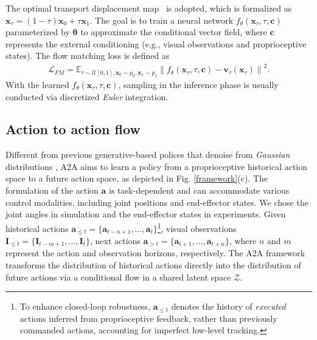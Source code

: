 \documentclass[onecolumn]{fairmeta}
\newcommand{\m}[1]{{A2A}}
\begin{document}
	The optimal transport displacement map~\citep{flowmatching} is adopted, which is formalized as $\mathbf{x}_\tau = (1 - \tau)\mathbf{x}_0 + \tau \mathbf{x}_1$. The goal is to train a neural network $f_\theta(\mathbf{x}_\tau, \tau, \mathbf{c})$ parameterized by $\mathbf{\theta}$ to approximate the conditional vector field, where $\mathbf{c}$ represents the external conditioning (e.g., visual observations and proprioceptive states). The flow matching loss is defined as 
	\begin{equation}
		\begin{aligned}
			\mathcal{L}_{FM} = \mathbb{E}_{\tau \sim \mathcal{U}[0,1], \mathbf{x}_0\sim p_0, \mathbf{x}_1\sim p_1} \left\| f_\theta(\mathbf{x}_\tau, \tau, \mathbf{c}) - \mathbf{v}_\tau(\mathbf{x}_\tau) \right\|^2.
			\label{general_loss}
		\end{aligned}
	\end{equation}
	With the learned $f_\theta(\mathbf{x}_\tau, \tau, \mathbf{c})$, sampling in the inference phase is usually conducted via discretized \textit{Euler} integration.
	
	
	
	\subsection{Action to action flow}
	Different from previous generative-based polices that denoise from \textit{Gaussian} distributions \citep{ddpm, flowmatching, dp}, \m{} aims to learn a policy from a proprioceptive historical action space to a future action space, as depicted in Fig. \ref{framework}(c). The formulation of the action $\mathbf{a}$ is task-dependent and can accommodate various control modalities, including joint positions and end-effector states. We chose the joint angles in simulation and the end-effector states in experiments. Given historical actions $\mathbf{a}_{\leq t} = \{\mathbf{a}_{t-n+1}, \dots, \mathbf{a}_t\}$\footnote{To enhance closed-loop robustness, $\mathbf{a}_{\leq t}$ denotes the history of {\textit{executed}} actions inferred from proprioceptive feedback, rather than previously commanded actions, accounting for imperfect low-level tracking.}, visual observations $\mathbf{I}_{\leq t}= \{\mathbf{I}_{t-m+1}, \dots, \mathbf{I}_t\}$, next actions $\mathbf{a}_{> t} = \{\mathbf{a}_{t+1}, \dots, \mathbf{a}_{t+n}\}$, where $n$ and $m$ represent the action and observation horizons, respectively. The \m{} framework transforms the distribution of historical actions directly into the distribution of future actions via a conditional flow in a shared latent space $\mathcal{Z}$.
	
\end{document}
